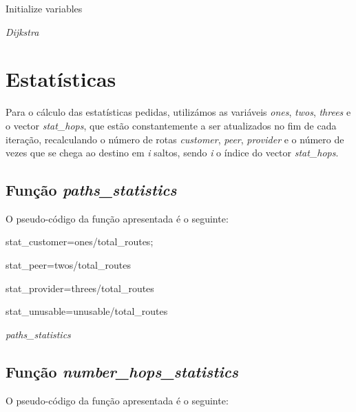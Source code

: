 \documentclass[a4paper]{article}
\begin{document}
\begin{algorithm}[H]
 Initialize variables\;
 
 
 \caption{\textit{Dijkstra}}
\end{algorithm}

\section{Estatísticas}
Para o cálculo das estatísticas pedidas, utilizámos as variáveis \textit{ones}, \textit{twos}, \textit{threes} e o vector \textit{stat\_hops}, que estão constantemente a ser atualizados no fim de cada iteração, recalculando o número de rotas \textit{customer}, \textit{peer}, \textit{provider} e o número de vezes que se chega ao destino em \textit{i} saltos, sendo \textit{i} o índice do vector \textit{stat\_hops}.
\subsection{Função \textit{paths\_statistics}}
O pseudo-código da função apresentada é o seguinte:

\begin{algorithm}[H]
  stat\_customer=ones/total\_routes;
  
  stat\_peer=twos/total\_routes\;
  
  stat\_provider=threes/total\_routes\;
  
  stat\_unusable=unusable/total\_routes\;
 \caption{\textit{paths\_statistics}}
\end{algorithm}
\subsection{Função \textit{number\_hops\_statistics}}
O pseudo-código da função apresentada é o seguinte:
\end{document}
